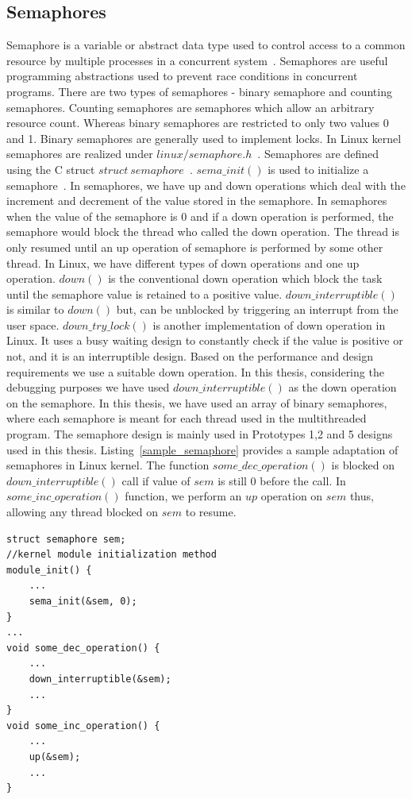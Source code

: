 \subsection{Semaphores}

Semaphore is a variable or abstract data type used to control access to a common resource by multiple processes in a concurrent system~\citep{dijkstra1968cooperating}\citep{dijkstra1968structure}. 
Semaphores are useful programming abstractions used to prevent race conditions in concurrent programs. 
There are two types of semaphores - binary semaphore and counting semaphores. 
Counting semaphores are semaphores which allow an arbitrary resource count. 
Whereas binary semaphores are restricted to only two values 0 and 1. 
Binary semaphores are generally used to implement locks. 
In Linux kernel semaphores are realized under $linux/semaphore.h$~\citep{semaphoreheader}. 
Semaphores are defined using the C struct $struct\ semaphore$~\citep{semaphoreheader}. 
$sema\_init()$ is used to initialize a semaphore~\citep{semaphoreheader}. 
In semaphores, we have up and down operations which deal with the increment and decrement of the value stored in the semaphore. 
In semaphores when the value of the semaphore is 0 and if a down operation is performed, the semaphore would block the thread who called the down operation. 
The thread is only resumed until an up operation of semaphore is performed by some other thread. 
In Linux, we have different types of down operations and one up operation. 
$down()$  is the conventional down operation which block the task until the semaphore value is retained to a positive value. 
$down\_interruptible()$ is similar to $down()$ but, can be unblocked by triggering an interrupt from the user space. 
$down\_try\_lock()$ is another implementation of down operation in Linux. 
It uses a busy waiting design to constantly check if the value is positive or not, and it is an interruptible design. 
Based on the performance and design requirements we use a suitable down operation. 
In this thesis, considering the debugging purposes we have used $down\_interruptible()$ as the down operation on the semaphore. 
In this thesis, we have used an array of binary semaphores, where each semaphore is meant for each thread used in the multithreaded program. 
The semaphore design is mainly used in Prototypes 1,2 and 5 designs used in this thesis. 
Listing~\ref{sample_semaphore} provides a sample adaptation of semaphores in Linux kernel. 
The function $some\_dec\_operation()$ is blocked on $down\_interruptible()$ call if value of $sem$ is still 0 before the call. 
In $some\_inc\_operation()$ function, we perform an $up$ operation on $sem$ thus, allowing any thread blocked on $sem$ to resume. 
\begin{lstlisting}[mathescape=true,style=customc,caption={Writing a sample Linux kernel program with semaphores},label={sample_semaphore}]
struct semaphore sem;
//kernel module initialization method
module_init() {
	...
	sema_init(&sem, 0);
}
...
void some_dec_operation() {
	...
	down_interruptible(&sem);	
	...
}
void some_inc_operation() {
	...
	up(&sem);
	...
}

\end{lstlisting}

